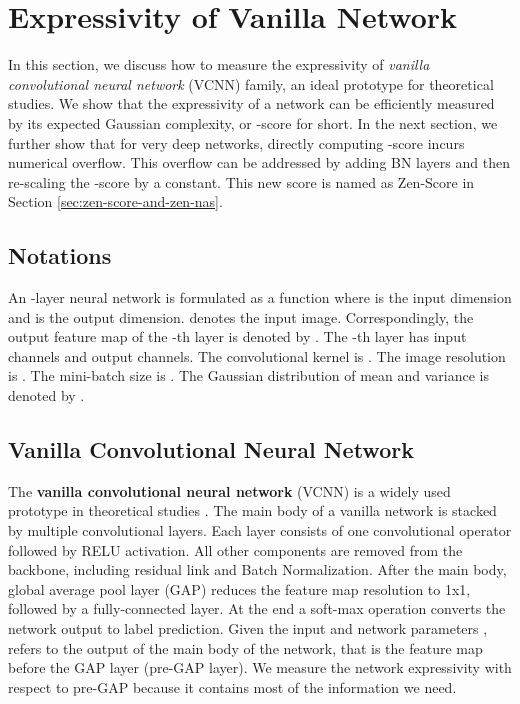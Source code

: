 \documentclass{article}
\begin{document}
\section{Expressivity of Vanilla Network}
\label{sec:Expressivity-of-Vanilla-Network}

In this section, we discuss how to measure the expressivity of \emph{vanilla convolutional neural network}  (VCNN) family, an ideal prototype for theoretical studies. We show that the expressivity of a network can be efficiently measured by its expected Gaussian complexity, or -score for short. In the next section, we further show that for very deep networks, directly computing -score incurs numerical overflow. This overflow can be addressed by adding BN layers and then re-scaling the -score by a constant. This new score is named as Zen-Score in Section \ref{sec:zen-score-and-zen-nas}.

\subsection{Notations}

An -layer neural network is formulated as a function  where  is the input dimension and  is the output dimension.  denotes the input image. Correspondingly, the output feature map of the -th layer is denoted by .  The -th layer has  input
channels and  output channels. The convolutional kernel is . The image resolution is . The mini-batch size is . The Gaussian distribution of mean  and variance  is denoted by . 

\subsection{Vanilla Convolutional Neural Network}



The \textbf{vanilla convolutional neural network} (VCNN) is a widely used prototype in theoretical  studies \cite{pooleExponentialExpressivityDeep2016,serraBoundingCountingLinear2018,haninComplexityLinearRegions2019}. The main body of a vanilla network is stacked by multiple convolutional layers. Each layer consists of one convolutional operator followed by RELU activation. All other components are removed from the backbone, including residual link and Batch Normalization. After the main body, global average pool layer (GAP) reduces the feature map resolution to 1x1, followed by a fully-connected layer. At the end a soft-max operation converts the network output to label prediction. Given the input  and network parameters ,   refers to the output of the main body of the network, that is the feature map before the GAP layer (pre-GAP layer). We measure the network expressivity with respect to pre-GAP because it contains most of the information we need.
\end{document}
